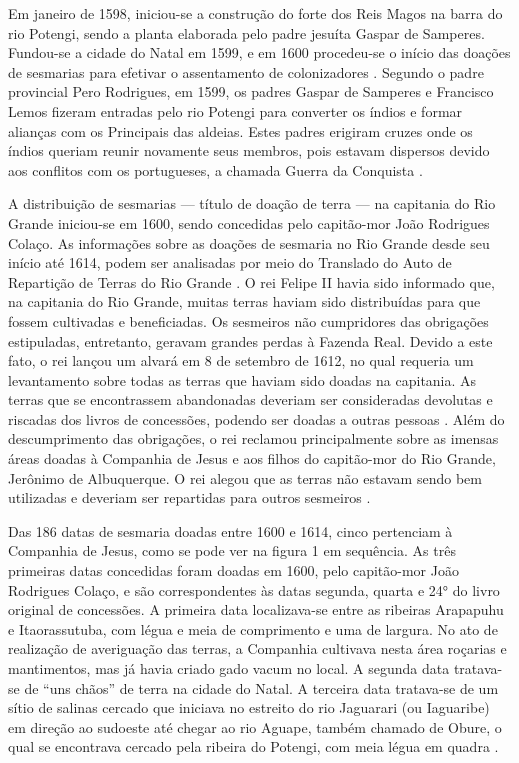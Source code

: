 Em janeiro de 1598, iniciou-se a construção do forte dos Reis Magos na barra do rio Potengi, sendo a planta elaborada pelo padre jesuíta Gaspar de Samperes. Fundou-se a cidade do Natal em 1599, e em 1600 procedeu-se o início das doações de sesmarias para efetivar o assentamento de colonizadores \cite[p.~24,~44]{Cascudo1984}. Segundo o padre provincial Pero Rodrigues, em 1599, os padres Gaspar de Samperes e Francisco Lemos fizeram entradas pelo rio Potengi para converter os índios e formar alianças com os Principais das aldeias. Estes padres erigiram cruzes onde os índios queriam reunir novamente seus membros, pois estavam dispersos devido aos conflitos com os portugueses, a chamada Guerra da Conquista \cite[Tombo~V,~p.~361--363]{Leite2004}. 

A distribuição de sesmarias --- título de doação de terra --- na capitania do Rio Grande iniciou-se em 1600, sendo concedidas pelo capitão-mor João Rodrigues Colaço. As informações sobre as doações de sesmaria no Rio Grande desde seu início até 1614, podem ser analisadas por meio do Translado do Auto de Repartição de Terras do Rio Grande \cite{Translado1909}. O rei Felipe II havia sido informado que, na capitania do Rio Grande, muitas terras haviam sido distribuídas para que fossem cultivadas e beneficiadas. Os sesmeiros não cumpridores das obrigações estipuladas, entretanto, geravam grandes perdas à Fazenda Real. Devido a este fato, o rei lançou um alvará em 8 de setembro de 1612, no qual requeria um levantamento sobre todas as terras que haviam sido doadas na capitania. As terras que se encontrassem abandonadas deveriam ser consideradas devolutas e riscadas dos livros de concessões, podendo ser doadas a outras pessoas \cite[p.~7--12]{Translado1909}. Além do descumprimento das obrigações, o rei reclamou principalmente sobre as imensas áreas doadas à Companhia de Jesus e aos filhos do capitão-mor do Rio Grande, Jerônimo de Albuquerque. O rei alegou que as terras não estavam sendo bem utilizadas e deveriam ser repartidas para outros sesmeiros \cite[p.~6--9]{Translado1909}.  

Das 186 datas de sesmaria doadas entre 1600 e 1614, cinco pertenciam à Companhia de Jesus, como se pode ver na figura 1 em sequência. As três primeiras datas concedidas foram doadas em 1600, pelo capitão-mor João Rodrigues Colaço, e são correspondentes às datas segunda, quarta e 24° do livro original de concessões. A primeira data localizava-se entre as ribeiras Arapapuhu e Itaorassutuba, com légua e meia de comprimento e uma de largura. No ato de realização de averiguação das terras, a Companhia cultivava nesta área roçarias e mantimentos, mas já havia criado gado vacum no local. A segunda data tratava-se de “uns chãos” de terra na cidade do Natal. A terceira data tratava-se de um sítio de salinas cercado que iniciava no estreito do rio Jaguarari (ou Iaguaribe) em direção ao sudoeste até chegar ao rio Aguape, também chamado de Obure, o qual se encontrava cercado pela ribeira do Potengi, com meia légua em quadra \cite[p.~19,~20~e~25]{Translado1909}.


